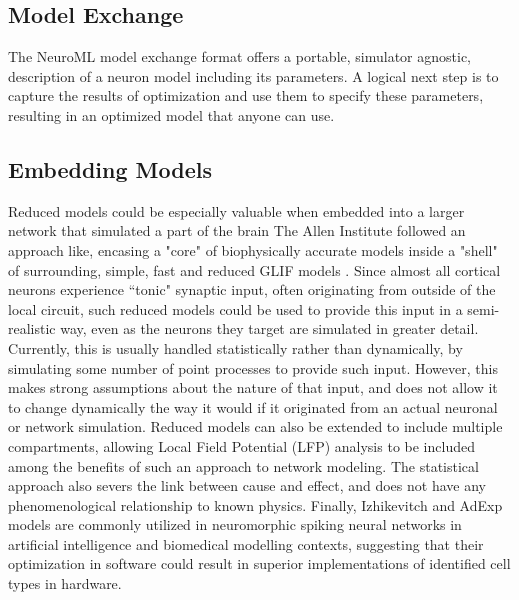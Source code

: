 \subsection{Model Exchange}
The NeuroML model exchange format \citep{gleeson2010neuroml} offers a portable, simulator agnostic, description of a neuron model including its parameters.
A logical next step is to capture the results of optimization and use them to specify these parameters, resulting in an optimized model that anyone can use.

\subsection{Embedding Models}
Reduced models could be especially valuable when embedded into a larger network that simulated a part of the brain
The Allen Institute followed an approach like, encasing a "core" of biophysically accurate models inside a "shell" of surrounding, simple, fast and reduced GLIF models \citep{billeh2020systematic}.
Since almost all cortical neurons experience ``tonic" synaptic input, often originating from outside of the local circuit, such reduced models could be used to provide this input in a semi-realistic way, even as the neurons they target are simulated in greater detail.
Currently, this is usually handled statistically rather than dynamically, by simulating some number of point processes to provide such input.
However, this makes strong assumptions about the nature of that input, and does not allow it to change dynamically the way it would if it originated from an actual neuronal or network simulation.
Reduced models can also be extended to include multiple compartments, allowing Local Field Potential (LFP) analysis to be included among the benefits of such an approach to network modeling.
The statistical approach also severs the link between cause and effect, and does not have any phenomenological relationship to known physics.
Finally, Izhikevitch and AdExp models are commonly utilized in neuromorphic spiking neural networks in artificial intelligence and biomedical modelling contexts, suggesting that their optimization in software could result in superior implementations of identified cell types in hardware.


